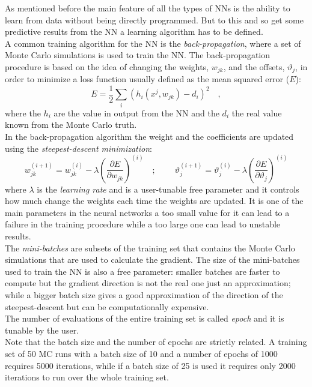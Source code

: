 \noindent As mentioned before the main feature of all the types of NNs is the ability to learn from data without being directly programmed.
But to this and so get some predictive results from the NN a learning algorithm has to be defined.
\\
A common training algorithm for the NN is the \textit{back-propagation}, where a set of Monte Carlo simulations is used to train the NN. The back-propagation procedure is based on the idea of changing the weights, $w_{jk}$, and the offsets, $\vartheta_{j}$, in order to minimize a loss function usually defined as the mean squared error ($E$):
\begin{equation}
	E=\frac{1}{2}\displaystyle\sum_i(h_{i}(x^j,w_{jk})-d_i)^2\quad,
\end{equation}  
where the $h_{i}$ are the value in output from the NN and the $d_{i}$ the real value known from the Monte Carlo truth.
\\
In the back-propagation algorithm the weight and the coefficients are updated using the \textit{steepest-descent minimization}:
\begin{equation}
	w_{jk}^{(i+1)}=w_{jk}^{(i)}-\lambda\left( \frac{\partial E}{\partial w_{jk}} \right)^{(i)}
	\quad; \ \qquad
	\vartheta_{j}^{(i+1)}=\vartheta_{j}^{(i)}-\lambda\left( \frac{\partial E}{\partial \vartheta_{j}} \right)^{(i)}
	\label{eq:learning_bp}
\end{equation}
where $\lambda$ is the \textit{learning rate} and is a user-tunable free parameter and it controls how much change the weights each time the weights are updated.
It is one of the main parameters in the neural networks a too small value for it can lead to a failure in the training procedure while a too large one can lead to unstable results. 
\\
The \textit{mini-batches} are subsets of the training set that contains the Monte Carlo simulations that are used to calculate the gradient. The size of the mini-batches used to train the NN is also a free parameter: smaller batches are faster to compute but the gradient direction is not the real one just an approximation; while a bigger batch size gives a good approximation of the direction of the steepest-descent but can be computationally expensive. 
\\
The number of evaluations of the entire training set is called \textit{epoch} and it is tunable by the user.
\\
Note that the batch size and the number of epochs are strictly related. A training set of 50 MC runs with a batch size of 10 and a number of epochs of 1000 requires 5000 iterations, while if a batch size of 25 is used it requires only 2000 iterations to run over the whole training set.
